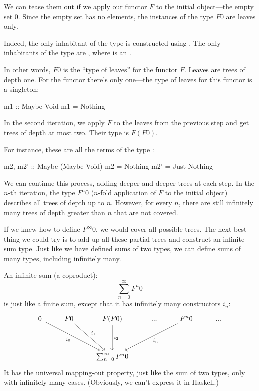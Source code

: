 \documentclass[DaoFP]{subfiles}
\begin{document}
We can tease them out if we apply our functor $F$ to the initial object---the empty set $0$. Since the empty set has no elements, the instances of the type $F 0$ are leaves only. 

Indeed, the only inhabitant of the type  is constructed using . The only inhabitants of the type  are , where  is an .

In other words, $F 0$ is the ``type of leaves'' for the functor $F$. Leaves are trees of depth one. For the  functor there's only one---the type of leaves for this functor is a singleton:
\begin{haskell}
m1 :: Maybe Void
m1 = Nothing
\end{haskell}

In the second iteration, we apply $F$ to the leaves from the previous step and get trees of depth at most two. Their type is $F(F 0)$. 

For instance, these are all the terms of the type :
\begin{haskell}
m2, m2' :: Maybe (Maybe Void)
m2 = Nothing
m2' = Just Nothing
\end{haskell}

We can continue this process, adding deeper and deeper trees at each step. In the $n$-th iteration, the type $F^n 0$ ($n$-fold application of $F$ to the initial object) describes all trees of depth up to $n$. However, for every $n$, there are still infinitely many trees of depth greater than $n$ that are not covered. 

If we knew how to define $F^{\infty} 0$, we would cover all possible trees. The next best thing we could try is to add up all these partial trees and construct an infinite sum type. Just like we have defined sums of two types, we can define sums of many types, including infinitely many. 

An infinite sum (a coproduct):
$$ \sum_{n = 0}^{\infty} F^n 0$$
is just like a finite sum, except that it has infinitely many constructors $i_n$:
\[
 \begin{tikzcd}
 0
 \arrow[ddrr, "i_0"']
 & F 0
  \arrow[ddr, "i_1"]
& F (F 0)
  \arrow[dd, "i_2"]
 & ...
 & F^n 0
  \arrow[ddll, "i_n"]
 & ...
 \\
 \\
 &&\sum_{n = 0}^{\infty} F^n 0
  \end{tikzcd}
\]
It has the universal mapping-out property, just like the sum of two types, only with infinitely many cases. (Obviously, we can't express it in Haskell.)
\end{document}
